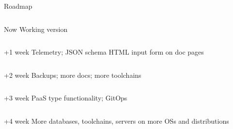 \documentclass[aspectratio=169]{beamer}
\begin{document}
\begin{frame}{Roadmap}
    \begin{columns}
        \begin{column}{0.8\textwidth}
            \begin{block}{Now}
                Working version
            \end{block}
        \end{column}
    \end{columns}
    \begin{columns}
        \begin{column}{0.8\textwidth}
            \begin{block}{+1 week}
                Telemetry; JSON schema HTML input form on doc pages
            \end{block}
        \end{column}
    \end{columns}
    \begin{columns}
        \begin{column}{0.8\textwidth}
            \begin{block}{+2 week}
                Backups; more docs; more toolchains
            \end{block}
        \end{column}
    \end{columns}
    \begin{columns}
        \begin{column}{0.8\textwidth}
            \begin{block}{+3 week}
                PaaS type functionality; GitOps
            \end{block}
        \end{column}
    \end{columns}
    \begin{columns}
        \begin{column}{0.8\textwidth}
            \begin{block}{+4 week}
                More databases, toolchains, servers on more OSs and distributions
            \end{block}
        \end{column}
    \end{columns}
\end{frame}
\end{document}
